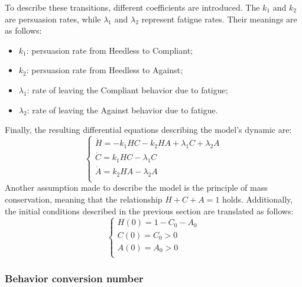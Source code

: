 To describe these transitions, different coefficients are introduced. The $k_1$ and $k_2$ are persuasion rates, while $\lambda_1$ and $\lambda_2$ represent fatigue rates. Their meanings are as follows: \begin{itemize} 
	\item $k_1$: persuasion rate from Heedless to Compliant; 
	\item $k_2$: persuasion rate from Heedless to Against; 
	\item $\lambda_1$: rate of leaving the Compliant behavior due to fatigue; 
	\item $\lambda_2$: rate of leaving the Against behavior due to fatigue. 
\end{itemize}

Finally, the resulting differential equations describing the model's dynamic are:
\begin{equation}
	\label{eq:behavioural_eq}
	\begin{cases}
		\dot{H} = -k_1 H C - k_2 H A + \lambda_1 C + \lambda_2 A \\
		\dot{C} = k_1 H C -  \lambda_1 C \\
		\dot{A} = k_2 H A -  \lambda_2 A\\
	\end{cases}
\end{equation}
Another assumption made to describe the model is the principle of mass conservation, meaning that the relationship $H + C + A = 1$ holds. Additionally, the initial conditions described in the previous section are translated as follows:
\begin{equation}
	\begin{cases}
		H(0) = 1 - C_0 - A_0\\
		C(0) = C_0 > 0\\
		A(0) = A_0 > 0\\
	\end{cases}
\end{equation}

\subsubsection{Behavior conversion number}

